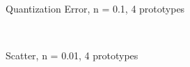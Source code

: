 \documentclass[10pt,a4paper]{article}
\begin{document}
\begin{figure}
  \centering
{} \\
  \caption{Quantization Error, n = 0.1, 4 prototypes}
  \label{fig:n01_k4_learning}
\end{figure}

\begin{figure}
  \centering
{} \\
  \caption{Scatter, n = 0.01, 4 prototypes}
  \label{fig:n001_k4}
\end{figure}
\end{document}
